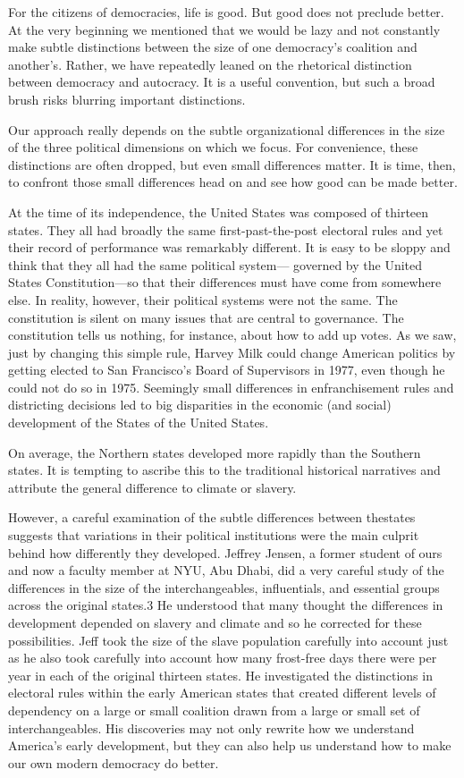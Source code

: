 \documentclass[10pt]{article}
\begin{document}
{\large For the citizens of democracies, life is good. But good does not
preclude better. At the very beginning we mentioned that we would be lazy and not
constantly make subtle distinctions between the size of one democracy's coalition
and another's. Rather, we have repeatedly leaned on the rhetorical distinction
between democracy and autocracy. It is a useful convention, but such a broad
brush risks blurring important distinctions.}

{\large Our approach really depends on the subtle organizational differences in
the size of the three political dimensions on which we focus. For convenience,
these distinctions are often dropped, but even small differences matter. It is
time, then, to confront those small differences head on and see how good can be
made better.}

{\large At the time of its independence, the United States was composed of
thirteen states. They all had broadly the same first-past-the-post electoral
rules and yet their record of performance was remarkably different. It is easy to
be sloppy and think that they all had the same political system--- governed by
the United States Constitution---so that their differences must have come from
somewhere else. In reality, however, their political systems were not the same.
The constitution is silent on many issues that are central to governance. The
constitution tells us nothing, for instance, about how to add up votes. As we
saw, just by changing this simple rule, Harvey Milk could change American
politics by getting elected to San Francisco's Board of Supervisors in 1977, even
though he could not do so in 1975. Seemingly small differences in enfranchisement
rules and districting decisions led to big disparities in the economic (and
social) development of the States of the United States.}

{\large On average, the Northern states developed more rapidly than the Southern
states. It is tempting to ascribe this to the traditional historical narratives
and attribute the general difference to climate or slavery.}

{\large However, a careful examination of the subtle differences between
thestates suggests that variations in their political institutions were the main
culprit behind how differently they developed. Jeffrey Jensen, a former student
of ours and now a faculty member at NYU, Abu Dhabi, did a very careful study of
the differences in the size of the interchangeables, influentials, and essential
groups across the original states.3 He understood that many thought the
differences in development depended on slavery and climate and so he corrected
for these possibilities. Jeff took the size of the slave population carefully
into account just as he also took carefully into account how many frost-free days
there were per year in each of the original thirteen states. He investigated the
distinctions in electoral rules within the early American states that created
different levels of dependency on a large or small coalition drawn from a large
or small set of interchangeables. His discoveries may not only rewrite how we
understand America's early development, but they can also help us understand how
to make our own modern democracy do better.}
\end{document}

